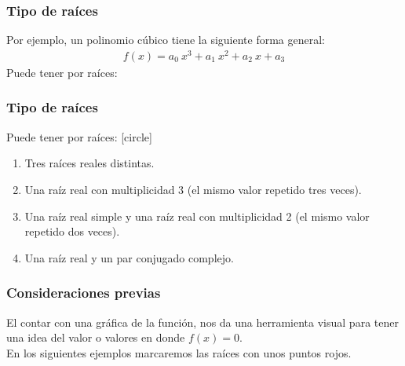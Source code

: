 \begin{frame}
\frametitle{Tipo de raíces}
Por ejemplo, un polinomio cúbico tiene la siguiente forma general:
\begin{align*}
f(x) = a_{0} \: x^{3} + a_{1} \: x^{2} + a_{2} \: x + a_{3}
\end{align*}
Puede tener por raíces:
\end{frame}
\begin{frame}
\frametitle{Tipo de raíces}
Puede tener por raíces:
[circle]
\begin{enumerate}[<+->]
\item Tres raíces reales distintas.
\item Una raíz real con multiplicidad 3 (el mismo valor repetido tres veces).
\item Una raíz real simple y una raíz real con multiplicidad 2 (el mismo valor repetido dos veces).
\item Una raíz real y un par conjugado complejo.
\end{enumerate}
\end{frame}
\begin{frame}
\frametitle{Consideraciones previas}
El contar con una gráfica de la función, nos da una herramienta visual para tener una idea del valor o valores en donde $f(x) = 0$.
\\
\bigskip
En los siguientes ejemplos marcaremos las raíces con unos puntos rojos.
\end{frame}
